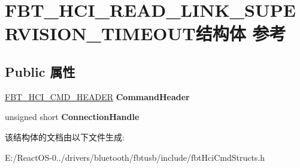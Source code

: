 \hypertarget{struct_f_b_t___h_c_i___r_e_a_d___l_i_n_k___s_u_p_e_r_v_i_s_i_o_n___t_i_m_e_o_u_t}{}\section{F\+B\+T\+\_\+\+H\+C\+I\+\_\+\+R\+E\+A\+D\+\_\+\+L\+I\+N\+K\+\_\+\+S\+U\+P\+E\+R\+V\+I\+S\+I\+O\+N\+\_\+\+T\+I\+M\+E\+O\+U\+T结构体 参考}
\label{struct_f_b_t___h_c_i___r_e_a_d___l_i_n_k___s_u_p_e_r_v_i_s_i_o_n___t_i_m_e_o_u_t}
\subsection*{Public 属性}
\begin{DoxyCompactItemize}
\item 
\mbox{\label{struct_f_b_t___h_c_i___r_e_a_d___l_i_n_k___s_u_p_e_r_v_i_s_i_o_n___t_i_m_e_o_u_t_aff42fec53efa6029e0ea6b7065bc68dc}} 
\hyperlink{struct_f_b_t___h_c_i___c_m_d___h_e_a_d_e_r}{F\+B\+T\+\_\+\+H\+C\+I\+\_\+\+C\+M\+D\+\_\+\+H\+E\+A\+D\+ER} {\bfseries Command\+Header}
\item 
\mbox{\label{struct_f_b_t___h_c_i___r_e_a_d___l_i_n_k___s_u_p_e_r_v_i_s_i_o_n___t_i_m_e_o_u_t_aed56fc77e4efd101c7c40906f336a7c6}} 
unsigned short {\bfseries Connection\+Handle}
\end{DoxyCompactItemize}


该结构体的文档由以下文件生成\+:\begin{DoxyCompactItemize}
\item 
E\+:/\+React\+O\+S-\/0../drivers/bluetooth/fbtusb/include/fbt\+Hci\+Cmd\+Structs.\+h\end{DoxyCompactItemize}
